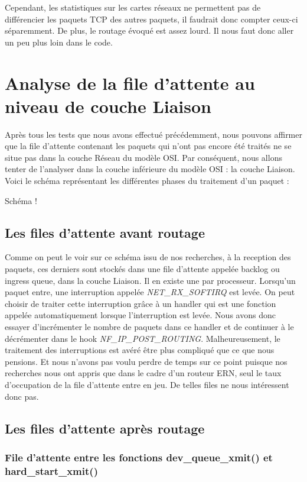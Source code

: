 \documentclass[a4paper]{article}
\begin{document}
Cependant, les statistiques sur les cartes réseaux ne permettent pas de
différencier les paquets TCP des autres paquets, il faudrait
donc compter ceux-ci séparemment. De plus, le routage évoqué
est assez lourd. Il nous faut donc aller un peu plus loin dans le code.

\section{Analyse de la file d'attente au niveau de couche Liaison}

Après tous les tests que nous avons effectué précédemment, nous pouvons affirmer
 que la file d'attente contenant les paquets qui n'ont pas encore été traités ne
  se situe pas dans la couche Réseau du modèle 
  OSI. Par conséquent, nous allons tenter de l'analyser dans la couche
   inférieure du modèle OSI : la couche Liaison. Voici le schéma représentant
    les différentes phases du traitement d'un paquet :

Schéma !

\subsection{Les files d'attente avant routage}
Comme on peut le voir sur ce schéma issu de nos recherches, à la reception des paquets, ces derniers sont stockés dans une file d'attente appelée backlog \cite{10poin} ou ingress queue, dans la couche Liaison. Il en existe une par processeur. 
Lorsqu'un paquet entre, une interruption appelée \textit{NET\_RX\_SOFTIRQ} est levée. On peut choisir de traiter cette interruption grâce à un handler qui est une fonction appelée automatiquement lorsque l'interruption est levée. Nous avons donc essayer d'incrémenter le nombre de paquets dans ce handler et de continuer à le décrémenter  dans le hook \textit{NF\_IP\_POST\_ROUTING}. Malheureusement, le traitement des interruptions est avéré être plus compliqué que ce que nous pensions. Et nous n'avons pas voulu perdre de temps sur ce point puisque nos recherches nous ont appris que dans le cadre d'un routeur ERN, seul le taux d'occupation de la file d'attente entre en jeu. De telles files ne nous intéressent donc pas. 

\subsection{Les files d'attente après routage}

\subsubsection{File d'attente entre les fonctions dev\_queue\_xmit() et hard\_start\_xmit()}
\end{document}
